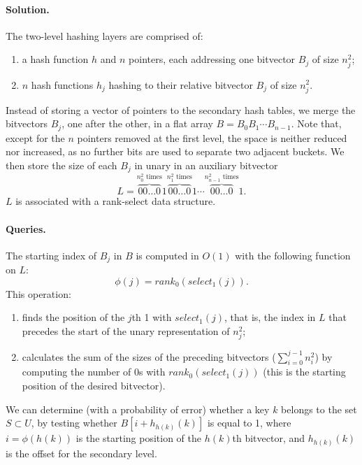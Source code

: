 \paragraph{Solution.} The two-level hashing layers are comprised of:
\begin{enumerate}
  \item a hash function $h$ and $n$ pointers, each addressing one bitvector $B_j$ of size $n_j^2$;
  \item $n$ hash functions $h_j$ hashing to their relative bitvector $B_j$ of size $n_j^2$.
\end{enumerate}
Instead of storing a vector of pointers to the secondary hash tables, we merge the bitvectors $B_j$, one after the other, in a flat array $B=B_0B_1 \cdots B_{n-1}$. Note that, except for the $n$ pointers removed at the first level, the space is neither reduced nor increased, as no further bits are used to separate two adjacent buckets. We then store the size of each $B_j$ in unary in an auxiliary bitvector
$$L = \overbrace{00 \dots 0}^{n_0^2 \text{ times}} 1 
      \overbrace{00 \dots 0}^{n_1^2 \text{ times}} 1 \cdots
      \overbrace{00 \dots 0}^{n_{n-1}^2 \text{ times}} 1.$$
$L$ is associated with a rank-select data structure.

\paragraph{Queries.} The starting index of $B_j$ in $B$ is computed in $O(1)$ with the following function on $L$: $$\phi(j)=rank_0(select_1(j)).$$ This operation:
\begin{enumerate}
  \item finds the position of the $j$th 1 with $select_1(j)$, that is, the index in $L$ that precedes the start of the unary representation of $n_j^2$;
  \item calculates the sum of the sizes of the preceding bitvectors ($\sum_{i=0}^{j-1} n_i^2$) by computing the number of $0$s with $rank_0(select_1(j))$ (this is the starting position of the desired bitvector).
\end{enumerate}
We can determine (with a probability of error) whether a key $k$ belongs to the set $S \subset U$, by testing whether $B[i+h_{h(k)}(k)]$ is equal to 1, where $i=\phi(h(k))$ is the starting position of the $h(k)$th bitvector, and $h_{h(k)}(k)$ is the offset for the secondary level.

